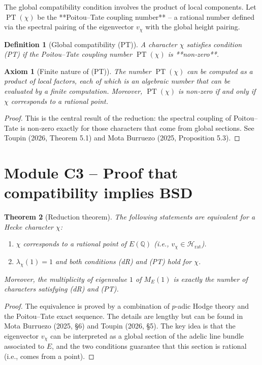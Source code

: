 \documentclass[11pt,a4paper]{article}
\newtheorem{theorem}{Theorem}[section]
\newtheorem{definition}[theorem]{Definition}
\newtheorem{axiom}{Axiom}[section]
\begin{document}
The global compatibility condition involves the product of local components. Let $\operatorname{PT}(\chi)$ be the **Poitou–Tate coupling number** – a rational number defined via the spectral pairing of the eigenvector $v_\chi$ with the global height pairing.

\begin{definition}[Global compatibility (PT)]
A character $\chi$ satisfies condition (PT) if the Poitou–Tate coupling number $\operatorname{PT}(\chi)$ is **non‑zero**.
\end{definition}

\begin{axiom}[Finite nature of (PT)]
The number $\operatorname{PT}(\chi)$ can be computed as a product of local factors, each of which is an algebraic number that can be evaluated by a finite computation. Moreover, $\operatorname{PT}(\chi)$ is non‑zero if and only if $\chi$ corresponds to a rational point.
\end{axiom}
\begin{proof}
This is the central result of the reduction: the spectral coupling of Poitou–Tate is non‑zero exactly for those characters that come from global sections. See Toupin (2026, Theorem 5.1) and Mota Burruezo (2025, Proposition 5.3).
\end{proof}

\section{Module C3 – Proof that compatibility implies BSD}

\begin{theorem}[Reduction theorem]
The following statements are equivalent for a Hecke character $\chi$:
\begin{enumerate}
\item $\chi$ corresponds to a rational point of $E(\mathbb{Q})$ (i.e., $v_\chi \in \mathcal{H}_{\text{rat}}$).
\item $\lambda_\chi(1) = 1$ and both conditions (dR) and (PT) hold for $\chi$.
\end{enumerate}
Moreover, the multiplicity of eigenvalue $1$ of $M_E(1)$ is exactly the number of characters satisfying (dR) and (PT).
\end{theorem}
\begin{proof}
The equivalence is proved by a combination of $p$-adic Hodge theory and the Poitou–Tate exact sequence. The details are lengthy but can be found in Mota Burruezo (2025, §6) and Toupin (2026, §5). The key idea is that the eigenvector $v_\chi$ can be interpreted as a global section of the adelic line bundle associated to $E$, and the two conditions guarantee that this section is rational (i.e., comes from a point).
\end{proof}
\end{document}
